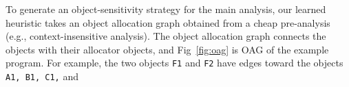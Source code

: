 \begin{comment}
The heuristic takes an OAG, which is obtained from a cheap
pre-analysis (e.g., context-insensitive analysis), and build an object-sensitivity strategy for the main analysis.
Fig~\ref{fig:oag} presents the object
allocation graph of the example program.
Object allocation graph connects objects with their allocator objects.
For example, the two objects {\tt
F1} and {\tt F2} have edges toward the objects {\tt A1, B1, C1,} and
{\tt C2} because the four objects are allocated in the method {\tt
  foo} with receiver objects {\tt F1} and {\tt F2}.
OAG has been considered as a good program representation to design heuristics for object-sensitivity that previous graph-based heuristics investigate the graph and figure out
objects that should be analyzed precisely~\cite{Tan2017} or methods that need to be analyzed coarsely~\cite{Li2018b}.
In Fig~\ref{fig:oag}, the nodes {\tt C1} and {\tt C2} belong to our
feature because they have a successor (e.g., {\tt O}) which has two incoming
edges and have a predecessor (e.g., {\tt F1} or {\tt F2}) that has
four outgoing edges. Other nodes do not belong to the feature because
they do not have such successor or predecessor.
The heuristic, then, build an analysis strategy for the main analysis:
methods called under receiver objects {\tt C1} and {\tt C2} are analyzed with 1-object-sensitivity while others are analyzed context insensitively.
In such context abstraction, {\tt get} and {\tt set} methods are separated into two different contexts (e.g., {\tt get[C1]}, {\tt get[C2]}, {\tt set[C1]}, and {\tt set[C2]}); thereby,
{\tt get[C1]} and {\tt get[C2]} return {\tt A1} and {\tt B1} at line 18 and 19,respectively.
As we mentioned above, it is the desirable context abstraction for the example program that proves all the queries.
It separates all the precision critical method calls while merges method calls which not related to the queries.
\end{comment}
To generate an object-sensitivity strategy for the main analysis, 
our learned heuristic takes an object allocation graph obtained from a cheap pre-analysis (e.g., context-insensitive analysis).
The object allocation graph connects the objects with their allocator objects, 
and Fig~\ref{fig:oag} is OAG of the example program.
For example, the two objects {\tt F1} and {\tt F2} have edges toward the objects {\tt A1, B1, C1,} and
